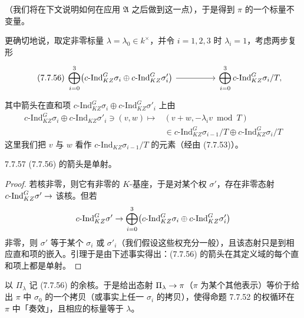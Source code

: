 （我们将在下文说明如何在应用 $\mathfrak A$ 之后做到这一点），于是得到 $\pi$ 的一个标量不变量。

更确切地说，取定非零标量 $\lambda=\lambda_0\in k^\times$，并令 $i=1,2,3$ 时 $\lambda_i=1$，考虑两步复形
\begin{equation}\tag{7.7.56}
\begin{tikzcd}[column sep=huge,row sep=small]
\displaystyle\bigoplus_{i=0}^{3}\bigl(c\text{-}\mathrm{Ind}_{KZ}^G\sigma_i\oplus c\text{-}\mathrm{Ind}_{KZ}^G\sigma'_i\bigr)\arrow[r] & \displaystyle\bigoplus_{i=0}^{3}c\text{-}\mathrm{Ind}_{KZ}^G\sigma_i/T,
\end{tikzcd}
\end{equation}
其中箭头在直和项 $c\text{-}\mathrm{Ind}_{KZ}^G\sigma_i\oplus c\text{-}\mathrm{Ind}_{KZ}^G\sigma'_i$ 上由
\[
\begin{aligned}
c\text{-}\mathrm{Ind}_{KZ}^G\sigma_i\oplus c\text{-}\mathrm{Ind}_{KZ}\sigma'_i\ni(v,w)\mapsto{}&(v+w,-\lambda_iv\bmod T)\\
&\in c\text{-}\mathrm{Ind}_{KZ}^G\sigma_{i-1}/T\oplus c\text{-}\mathrm{Ind}_{KZ}^G\sigma_i/T
\end{aligned}
\]
这里我们把 $v$ 与 $w$ 看作 $c\text{-}\mathrm{Ind}_{KZ}\sigma_{i-1}/T$ 的元素（经由 (7.7.53)）。

\begin{lem}{7.7.57}\label{lem:a4-7-7-57}
(7.7.56) 的箭头是单射。
\end{lem}

\begin{proof}
若核非零，则它有非零的 $K$-基座，于是对某个权 $\sigma'$，存在非零态射 $c\text{-}\mathrm{Ind}_{KZ}^G\sigma'\rightarrow$ 该核。但若
\[
c\text{-}\mathrm{Ind}_{KZ}^G\sigma'\rightarrow\bigoplus_{i=0}^{3}\bigl(c\text{-}\mathrm{Ind}_{KZ}^G\sigma_i\oplus c\text{-}\mathrm{Ind}_{KZ}^G\sigma'_i\bigr)
\]
非零，则 $\sigma'$ 等于某个 $\sigma_i$ 或 $\sigma'_i$（我们假设这些权充分一般），且该态射只是到相应直和项的嵌入。引理于是由下述事实得出：(7.7.56) 的箭头在其定义域的每个直和项上都是单射。
\end{proof}

以 $\Pi_\lambda$ 记 (7.7.56) 的余核。于是给出态射 $\Pi_\lambda\rightarrow\pi$（$\pi$ 为某个其他表示）等价于给出 $\pi$ 中 $\sigma_0$ 的一个拷贝（或事实上任一 $\sigma_i$ 的拷贝），使得命题 7.7.52 的权循环在 $\pi$ 中「奏效」，且相应的标量等于 $\lambda$。

